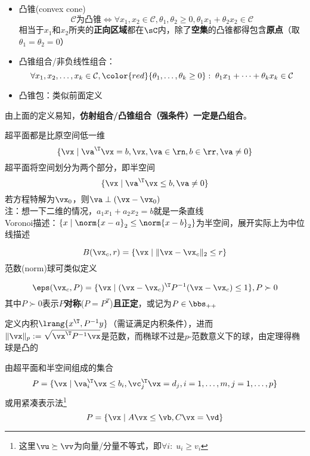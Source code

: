 \begin{definition}
\begin{itemize}
\item 凸锥(convex cone)
\[\mathcal{C}\text{为凸锥}\iff\forall x_1,x_2\in\mathcal{C},\theta_1,\theta_2\geq 0,\theta_1 x_1+\theta_2 x_2\in\mathcal{C}\]
相当于$x_1$和$x_2$所夹的\textbf{正向区域}都在$\sC$内，除了\textbf{空集}的凸锥都得包含\textbf{原点}（取$\theta_1=\theta_2=0$）
\item 凸锥组合/非负线性组合：
\[\forall x_1,x_2,\ldots,x_k\in\mathcal{C},{\color{red}{\theta_1,\ldots,\theta_k\geq 0}}:\;\theta_1 x_1+\cdots+\theta_k x_k\in\mathcal{C}\]
\item 凸锥包：类似前面定义
\end{itemize}
\end{definition}
由上面的定义易知，\textbf{仿射组合/凸锥组合（强条件）一定是凸组合}。

\begin{definition}
超平面都是比原空间低一维
\[\{\vx\mid \va^\T\vx=b,\vx,\va\in\rn,b\in\rr,\va\ne 0\}\]
超平面将空间划分为两个部分，即半空间
\[\{\vx\mid \va^\T\vx\leq b,\va\ne 0\}\]
若方程特解为$\vx_0$，则$\va\perp(\vx-\vx_0)$\\
注：想一下二维的情况，$a_1x_1+a_2x_2=b$就是一条直线\\
Voronoi描述：$\{x\mid\norm{x-a}_2\leq\norm{x-b}_2\}$为半空间，展开实际上为中位线描述
\end{definition}
\begin{definition}
\[B(\vx_c,r)=\{\vx\mid\|\vx-\vx_c\|_2\leq r\}\]
范数(norm)球可类似定义
\end{definition}
\begin{definition}[椭球(ellipsoid)]
\[\eps(\vx_c,P)=\{\vx\mid(\vx-\vx_c)^\T P^{-1}(\vx-\vx_c)\leq 1\},P\succ 0\]
其中$P\succ 0$表示$P$\textbf{对称}($P=P^T$)\textbf{且正定}，或记为$P\in\bbs_{++}$
\end{definition}
\begin{analysis}
定义内积$\lrang{x^\T, P^{-1}y}$（需证满足内积条件），进而$\|\vx\|_p:=\sqrt{\vx^\T P^{-1}\vx}$是范数，而椭球不过是$p$-范数意义下的球，由定理得椭球是凸的
\end{analysis}
\begin{definition}
	由超平面和半空间组成的集合
\[P=\{\vx\mid\va_i^\T\vx\leq b_i,\vc_j^\T\vx=d_j,i=1,\ldots,m,j=1,\ldots,p\}\]
或用紧凑表示法\footnote{这里$\vu\succeq \vv$为向量/分量不等式，即$\forall i:\;u_i\geq v_i$}
\[P=\{\vx\mid A\vx\leq \vb,C\vx=\vd\}\]
\end{definition}
